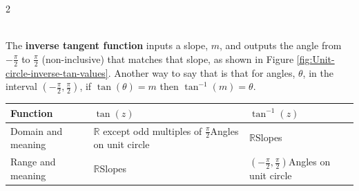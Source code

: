 \begin{multicols}{2}
	\begin{myDefinition}~\\[0.5mm]
		The \textbf{inverse tangent function} inputs a slope, $m$, and outputs the angle from $-\frac{\pi}{2}$ to $\frac{\pi}{2}$ (non-inclusive) that matches that slope, as shown in Figure \ref{fig:Unit-circle-inverse-tan-values}. Another way to say that is that for angles, $\theta$, in the interval $\left(-\frac{\pi}{2},\frac{\pi}{2}\right)$, if $\tan(\theta)=m$ then $\tan^{-1}(m)=\theta$.
		\begin{center}\captionsetup{type=table}\label{table:section-inverse-trig-definition-tan-inverse}
			\renewcommand{\arraystretch}{1.5}
			\begin{tabular}{|| p{2.3cm} | p{2.4cm} | p{2.3cm} ||}
				\hline
				Function			& $\tan(z)$										& $\tan^{-1}(z)$								\\
				\hline
				Domain and meaning	& $\mathbb{R}$ except odd multiples of $\frac{\pi}{2}$\newline Angles on unit circle	& $\mathbb{R}$\newline Slopes		\\
				\hline
				Range and meaning	& $\mathbb{R}$\newline Slopes		& $\left(-\frac{\pi}{2},\frac{\pi}{2}\right)$\newline Angles on unit circle\\
				\hline
			\end{tabular}
		\end{center}
		\columnbreak
		\begin{center}
			\captionsetup{type=figure} 
\end{center}
\end{myDefinition}
\end{multicols}
